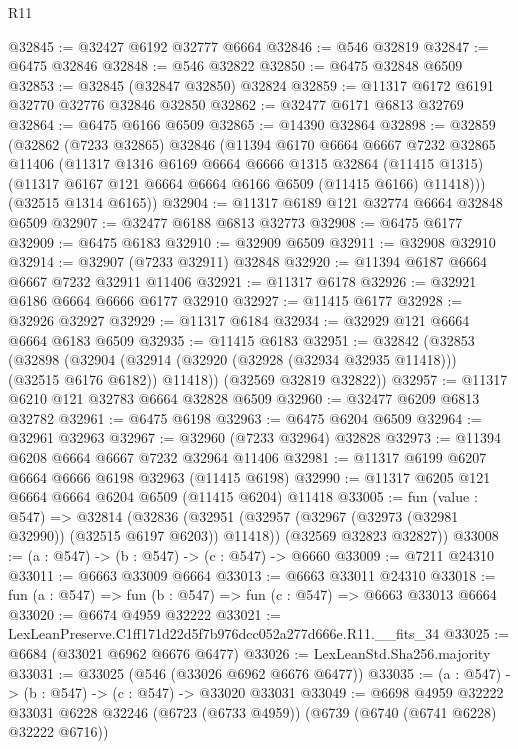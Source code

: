\begin{lexlean}{R11}
\begin{coremodule}
@32845 := @32427 @6192 @32777 @6664
@32846 := @546 @32819
@32847 := @6475 @32846
@32848 := @546 @32822
@32850 := @6475 @32848 @6509
@32853 := @32845 (@32847 @32850) @32824
@32859 := @11317 @6172 @6191 @32770 @32776 @32846 @32850
@32862 := @32477 @6171 @6813 @32769
@32864 := @6475 @6166 @6509
@32865 := @14390 @32864
@32898 := @32859
    (@32862
      (@7233 @32865)
      @32846
      (@11394
        @6170
        @6664
        @6667
        @7232
        @32865
        @11406
        (@11317
          @1316
          @6169
          @6664
          @6666
          @1315
          @32864
          (@11415 @1315)
          (@11317 @6167 @121 @6664 @6664 @6166 @6509 (@11415 @6166) @11418)))
      (@32515 @1314 @6165))
@32904 := @11317 @6189 @121 @32774 @6664 @32848 @6509
@32907 := @32477 @6188 @6813 @32773
@32908 := @6475 @6177
@32909 := @6475 @6183
@32910 := @32909 @6509
@32911 := @32908 @32910
@32914 := @32907 (@7233 @32911) @32848
@32920 := @11394 @6187 @6664 @6667 @7232 @32911 @11406
@32921 := @11317 @6178
@32926 := @32921 @6186 @6664 @6666 @6177 @32910
@32927 := @11415 @6177
@32928 := @32926 @32927
@32929 := @11317 @6184
@32934 := @32929 @121 @6664 @6664 @6183 @6509
@32935 := @11415 @6183
@32951 := @32842
    (@32853
      (@32898
        (@32904 (@32914 (@32920 (@32928 (@32934 @32935 @11418))) (@32515 @6176 @6182)) @11418))
      (@32569 @32819 @32822))
@32957 := @11317 @6210 @121 @32783 @6664 @32828 @6509
@32960 := @32477 @6209 @6813 @32782
@32961 := @6475 @6198
@32963 := @6475 @6204 @6509
@32964 := @32961 @32963
@32967 := @32960 (@7233 @32964) @32828
@32973 := @11394 @6208 @6664 @6667 @7232 @32964 @11406
@32981 := @11317 @6199 @6207 @6664 @6666 @6198 @32963 (@11415 @6198)
@32990 := @11317 @6205 @121 @6664 @6664 @6204 @6509 (@11415 @6204) @11418
@33005 := fun (value : @547) =>
  @32814
    (@32836
      (@32951 (@32957 (@32967 (@32973 (@32981 @32990)) (@32515 @6197 @6203)) @11418))
      (@32569 @32823 @32827))
@33008 := (a : @547) -> (b : @547) -> (c : @547) -> @6660
@33009 := @7211 @24310
@33011 := @6663 @33009 @6664
@33013 := @6663 @33011 @24310
@33018 := fun (a : @547) => fun (b : @547) => fun (c : @547) => @6663 @33013 @6664
@33020 := @6674 @4959 @32222
@33021 := LexLeanPreserve.C1ff171d22d5f7b976dcc052a277d666e.R11.__fits_34
@33025 := @6684 (@33021 @6962 @6676 @6477)
@33026 := LexLeanStd.Sha256.majority
@33031 := @33025 (@546 (@33026 @6962 @6676 @6477))
@33035 := (a : @547) -> (b : @547) -> (c : @547) -> @33020 @33031
@33049 := @6698
    @4959
    @32222
    @33031
    @6228
    @32246
    (@6723 (@6733 @4959))
    (@6739 (@6740 (@6741 @6228) @32222 @6716))

\end{coremodule}
\end{lexlean}
